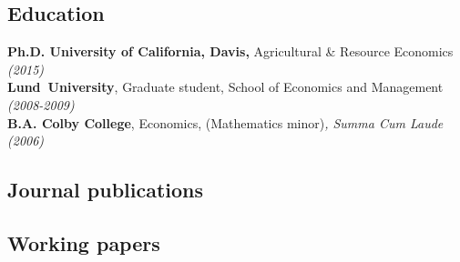 \documentclass[11pt]{article}
\begin{document}
\subsection*{\sc Education}

\hspace*{20pt}\textbf{Ph.D. University of California, Davis,} Agricultural \& Resource Economics \emph{(2015)} \\
\hspace*{20pt}\textbf{Lund~University}, Graduate student, School
of Economics and Management \emph{(2008-2009)} \\
\hspace*{20pt}\textbf{B.A. Colby College}, Economics, (Mathematics
minor)\emph{, Summa Cum Laude (2006)}

\subsection*{\sc Journal publications}

\nocite{tjernstrom_differences_2008}
\nocite{tjernstrom_rational_2008}
\nocite{tjernstrom_identifying_2013}
\nocite{barriga_cabanillas_fitting_2018}
\nocite{brown_natural_2018}
\nocite{carter_heterogeneous_2019}
\nocite{michler_money_2019}
\hspace*{20pt}%
\begin{minipage}[t]{0.9\textwidth}%
\vspace{-.9cm}
    \centering
    \renewcommand\refname{}
        
        
\end{minipage}

\vspace{-.3cm}
\subsection*{\sc Working papers}
\end{document}
